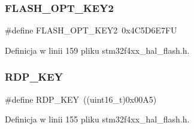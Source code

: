 \subsubsection{\texorpdfstring{F\+L\+A\+S\+H\+\_\+\+O\+P\+T\+\_\+\+K\+E\+Y2}{FLASH\_OPT\_KEY2}}
{\footnotesize\ttfamily \#define F\+L\+A\+S\+H\+\_\+\+O\+P\+T\+\_\+\+K\+E\+Y2~0x4\+C5\+D6\+E7\+FU}



Definicja w linii 159 pliku stm32f4xx\+\_\+hal\+\_\+flash.\+h.

\mbox{\label{group___f_l_a_s_h___keys_gae497135e5528d69274bf8daf7f077f23}} 
\subsubsection{\texorpdfstring{R\+D\+P\+\_\+\+K\+EY}{RDP\_KEY}}
{\footnotesize\ttfamily \#define R\+D\+P\+\_\+\+K\+EY~((uint16\+\_\+t)0x00\+A5)}



Definicja w linii 155 pliku stm32f4xx\+\_\+hal\+\_\+flash.\+h.

